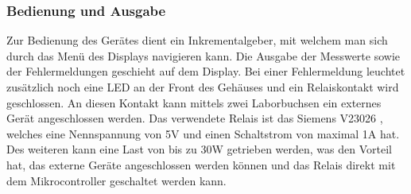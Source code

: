 \subsubsection{Bedienung und Ausgabe}
Zur Bedienung des Gerätes dient ein Inkrementalgeber, mit welchem man sich durch das Menü des Displays navigieren kann. Die Ausgabe der Messwerte sowie der Fehlermeldungen geschieht auf dem Display. Bei einer Fehlermeldung leuchtet zusätzlich noch eine LED an der Front des Gehäuses und ein Relaiskontakt wird geschlossen. An diesen Kontakt kann mittels zwei Laborbuchsen ein externes Gerät angeschlossen werden. Das verwendete Relais ist das Siemens V23026 \cite{Siemens_Rel}, welches eine Nennspannung von 5V und einen Schaltstrom von maximal 1A hat. Des weiteren kann eine Last von bis zu 30W getrieben werden, was den Vorteil hat, das externe Geräte angeschlossen werden können und das Relais direkt mit dem Mikrocontroller geschaltet werden kann.

